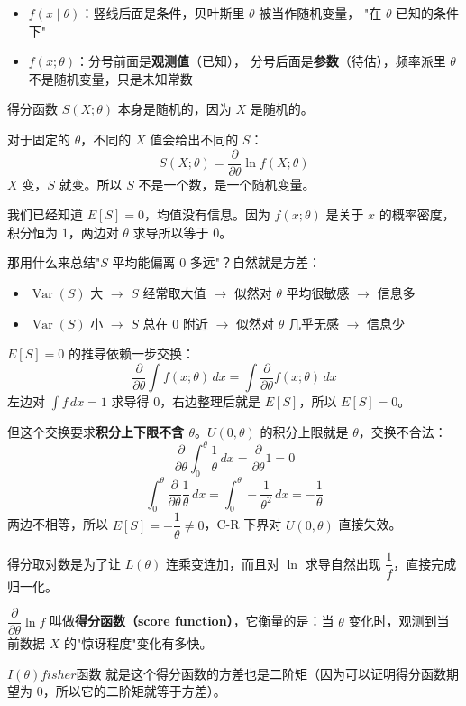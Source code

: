 \begin{itemize}
  \item $f(x \mid \theta)$：竖线后面是条件，贝叶斯里 $\theta$ 被当作随机变量，
        "在 $\theta$ 已知的条件下"
  \item $f(x;\theta)$：分号前面是\textbf{观测值}（已知），
        分号后面是\textbf{参数}（待估），频率派里 $\theta$ 不是随机变量，只是未知常数
\end{itemize}
\begin{note}
得分函数 $S(X;\theta)$ 本身是随机的，因为 $X$ 是随机的。

对于固定的 $\theta$，不同的 $X$ 值会给出不同的 $S$：
$$S(X;\theta) = \frac{\partial}{\partial\theta}\ln f(X;\theta)$$
$X$ 变，$S$ 就变。所以 $S$ 不是一个数，是一个随机变量。

我们已经知道 $E[S]=0$，均值没有信息。因为 $f(x;\theta)$ 是关于 $x$ 的概率密度，
积分恒为 $1$，两边对 $\theta$ 求导所以等于 $0$。

那用什么来总结"$S$ 平均能偏离 $0$ 多远"？自然就是方差：
\begin{itemize}
  \item $\operatorname{Var}(S)$ 大 $\to$ $S$ 经常取大值 $\to$ 似然对 $\theta$ 平均很敏感 $\to$ 信息多
  \item $\operatorname{Var}(S)$ 小 $\to$ $S$ 总在 $0$ 附近 $\to$ 似然对 $\theta$ 几乎无感 $\to$ 信息少
\end{itemize}
\end{note}
\begin{note}
    $E[S]=0$ 的推导依赖一步交换：
$$\frac{\partial}{\partial\theta}\int f(x;\theta)\,dx = \int \frac{\partial}{\partial\theta}f(x;\theta)\,dx$$
左边对 $\int f\,dx = 1$ 求导得 $0$，右边整理后就是 $E[S]$，所以 $E[S]=0$。

但这个交换要求\textbf{积分上下限不含 $\theta$}。$U(0,\theta)$ 的积分上限就是 $\theta$，交换不合法：
$$\frac{\partial}{\partial\theta}\int_0^\theta \frac{1}{\theta}\,dx = \frac{\partial}{\partial\theta}1 = 0$$
$$\int_0^\theta \frac{\partial}{\partial\theta}\frac{1}{\theta}\,dx = \int_0^\theta -\frac{1}{\theta^2}\,dx = -\frac{1}{\theta}$$
两边不相等，所以 $E[S] = -\dfrac{1}{\theta} \neq 0$，C-R 下界对 $U(0,\theta)$ 直接失效。
\end{note}
\begin{dxtips}[得分函数和fisher函数的关系]

得分取对数是为了让 $L(\theta)$ 连乘变连加，而且对 $\ln$ 求导自然出现 $\dfrac{1}{f}$，直接完成归一化。

$\dfrac{\partial}{\partial\theta}\ln f$ 叫做\textbf{得分函数（score function）}，它衡量的是：当 $\theta$ 变化时，观测到当前数据 $X$ 的"惊讶程度"变化有多快。

$I(\theta)$$fisher$函数 就是这个得分函数的方差也是二阶矩（因为可以证明得分函数期望为 $0$，所以它的二阶矩就等于方差）。
\end{dxtips}
